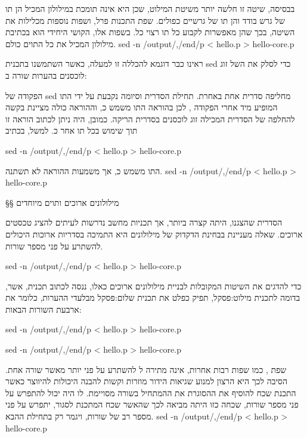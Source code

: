 בבסיסה, שיטה זו חלשה יותר משיטת המילוט, שכן היא אינה תומכת במילולון המכיל הן
תו של גרש בודד והן תו של גרשיים כפולים. שפת התכנות פרל, ושפות נוספות מכלילות
את השיטה, בכך שהן מאפשרות לקבוע כל תו רצוי כ ל. בשפות אלו, הקושי
היחידי הוא בכתיבת מילולון המכיל את כל התוים כולם.
\bash
sed -n /output/,/end/p < hello.p > hello-core.p
\END

ראינו כבר דוגמא להכללה זו למעלה, כאשר השתמשנו בתכנית sed כדי לסלק
את ה של זוג לוכסנים בהערות שורה ב:
\begin{קוד}
\end{קוד}
הפקודה  של sed מחליפה סדרית אחת באחרת. תחילת הסדרית וסיומה נקבעת על
ידי התו המופיע מיד אחרי הפקודה , לכן בהוראה  התו
 משמש כ, וההוראה כולה מציינת בקשה להחלפה של הסדרית המכילה זוג
לוכסנים בסדרית הריקה. כמובן, היה ניתן לכתוב הוראה זו תוך שימוש בכל תו אחר
כ. למשל, בכתיב
\begin{קוד}
\bash
sed -n /output/,/end/p < hello.p > hello-core.p
\END

\end{קוד}
התו  משמש כ, אך משמעות ההוראה לא תשתנה.
\bash
sed -n /output/,/end/p < hello.p > hello-core.p
\END

§§ מילולונים ארוכים ותוים מיוחדים

הסדרית  שהצגנו, היתה קצרה ביותר, אך תכניות מחשב נדרשות
לעיתים להציג טכסטים ארוכים. שאלה מעניינת בבחינת הדקדוק של מילולונים היא התמיכה
בסדריות ארוכות היכולים להשתרע על פני מספר שורות.

\bash
sed -n /output/,/end/p < hello.p > hello-core.p
\END

כדי להדגים את השיטות המקובלות לבניית מילולונים ארוכים כאלו, ננסה לכתוב תכנית,
אשר, בדומה ל תכנית מילוט:פסקל, תפיק כפלט את  תכנית שלום:פסקל מבלעדי
ההערות, כלומר את ארבעת השורות הבאות:

\bash
sed -n /output/,/end/p < hello.p > hello-core.p
\END

\begin{קוד}

\end{קוד}
\bash
sed -n /output/,/end/p < hello.p > hello-core.p
\END

שפת , כמו שפות רבות אחרות, אינה מתירה ל  להשתרע על פני
יותר מאשר שורה אחת. הסיבה לכך היא הרצון למנוע שגיאות הידור מוזרות וקשות להבנה
היכולות להיווצר כאשר התכנת שכח להוסיף את ה הסוגרת את ה המתחיל
בשורה מסויימת. לו היה  יכול להתפרש על פני מספר שורות, שכחה כזו
היתה מביאה לכך שה אשר שכח המתכנת לסגור, יתפרש על פני מספר רב של שורות,
ויגמר רק בתחילת ה הבא.
\bash
sed -n /output/,/end/p < hello.p > hello-core.p
\END

